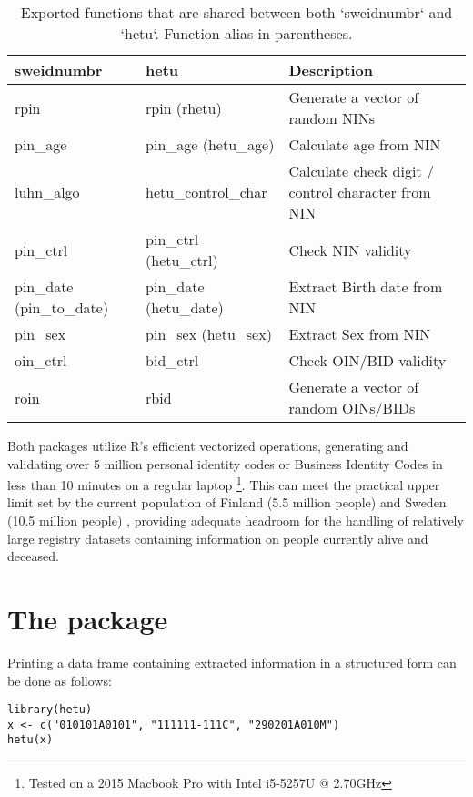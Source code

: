 \begin{table}[!h]
\centering
\caption{\label{tab:function-table}Exported functions that are shared between both `sweidnumbr` and `hetu`. Function alias in parentheses.}
\centering
\begin{tabular}[t]{lll}
\toprule
sweidnumbr & hetu & Description\\
\midrule
rpin & rpin (rhetu) & Generate a vector of random NINs\\
pin\_age & pin\_age (hetu\_age) & Calculate age from NIN\\
luhn\_algo & hetu\_control\_char & Calculate check digit / control character from NIN\\
pin\_ctrl & pin\_ctrl (hetu\_ctrl) & Check NIN validity\\
pin\_date (pin\_to\_date) & pin\_date (hetu\_date) & Extract Birth date from NIN\\
\addlinespace
pin\_sex & pin\_sex (hetu\_sex) & Extract Sex from NIN\\
oin\_ctrl & bid\_ctrl & Check OIN/BID validity\\
roin & rbid & Generate a vector of random OINs/BIDs\\
\bottomrule
\end{tabular}
\end{table}

Both packages utilize R's efficient vectorized operations, generating and validating over 5 million personal identity codes or Business Identity Codes in less than 10 minutes on a regular laptop \footnote{Tested on a 2015 Macbook Pro with Intel i5-5257U @ 2.70GHz}. This can meet the practical upper limit set by the current population of Finland (5.5 million people) \citep{svt2022} and Sweden (10.5 million people) \citep{scb2022}, providing adequate headroom for the handling of relatively large registry datasets containing information on people currently alive and deceased.

\section{\texorpdfstring{The  package}{The  package}}\label{the-package}

Printing a data frame containing extracted information in a structured form can be done as follows:

\begin{verbatim}
library(hetu)
x <- c("010101A0101", "111111-111C", "290201A010M")
hetu(x)
\end{verbatim}

